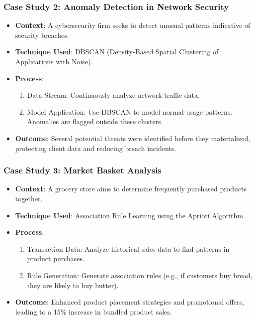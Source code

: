 \documentclass[aspectratio=169]{beamer}
\begin{document}
\begin{frame}[fragile]
    \frametitle{Case Study 2: Anomaly Detection in Network Security}
    \begin{itemize}
        \item \textbf{Context}: A cybersecurity firm seeks to detect unusual patterns indicative of security breaches.
        \item \textbf{Technique Used}: DBSCAN (Density-Based Spatial Clustering of Applications with Noise).
        \item \textbf{Process}:
        \begin{enumerate}
            \item Data Stream: Continuously analyze network traffic data.
            \item Model Application: Use DBSCAN to model normal usage patterns. Anomalies are flagged outside these clusters.
        \end{enumerate}
        \item \textbf{Outcome}: Several potential threats were identified before they materialized, protecting client data and reducing breach incidents.
    \end{itemize}
\end{frame}

\begin{frame}[fragile]
    \frametitle{Case Study 3: Market Basket Analysis}
    \begin{itemize}
        \item \textbf{Context}: A grocery store aims to determine frequently purchased products together.
        \item \textbf{Technique Used}: Association Rule Learning using the Apriori Algorithm.
        \item \textbf{Process}:
        \begin{enumerate}
            \item Transaction Data: Analyze historical sales data to find patterns in product purchases.
            \item Rule Generation: Generate association rules (e.g., if customers buy bread, they are likely to buy butter).
        \end{enumerate}
        \item \textbf{Outcome}: Enhanced product placement strategies and promotional offers, leading to a 15\% increase in bundled product sales.
    \end{itemize}
\end{frame}
\end{document}
